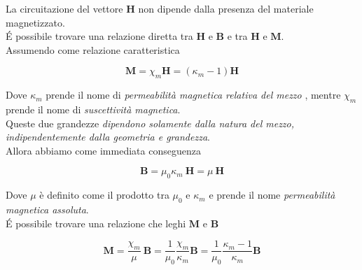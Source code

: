 La circuitazione del vettore $\mathbf{H}$ non dipende dalla presenza del materiale magnetizzato. \\

\'E possibile trovare una relazione diretta tra $\mathbf{H}$ e $\mathbf{B}$ e tra $\mathbf{H}$ e $\mathbf{M}$. \\
Assumendo come relazione caratteristica 

\begin{tcolorbox}[colback=yellow!10!white, colframe=orange!70!black, boxrule=0.8pt]
\begin{equation}
        \mathbf{M} = \chi_m \mathbf{H} = (\kappa_m - 1) \mathbf{H}
\end{equation}
\end{tcolorbox}

Dove $\kappa_m$ prende il nome di \emph{permeabilità magnetica relativa del mezzo} , mentre $\chi_m$ prende il nome di \emph{suscettività magnetica}. \\
Queste due grandezze \emph{dipendono solamente dalla natura del mezzo, indipendentemente dalla geometria e grandezza}. \\

Allora abbiamo come immediata conseguenza

\begin{tcolorbox}[colback=yellow!10!white, colframe=orange!70!black, boxrule=0.8pt]
\begin{equation}
        \mathbf{B} = \mu_0 \kappa_m \ \mathbf{H} = \mu \ \mathbf{H}
\end{equation}
\end{tcolorbox}

Dove $\mu$ è definito come il prodotto tra $\mu_0$ e $\kappa_m$ e prende il nome \emph{permeabilità magnetica assoluta}. \\

\'E possibile trovare una relazione che leghi $\mathbf{M}$ e $\mathbf{B}$

\begin{tcolorbox}[colback=yellow!10!white, colframe=orange!70!black, boxrule=0.8pt]
\begin{equation}
        \mathbf{M} = \frac{\chi_m}{\mu} \ \mathbf{B} = \frac{1}{\mu_0} \frac{\chi_m}{\kappa_m} \mathbf{B} = \frac{1}{\mu_0} \frac{\kappa_m - 1}{\kappa_m} \mathbf{B}
\end{equation}
\end{tcolorbox}

